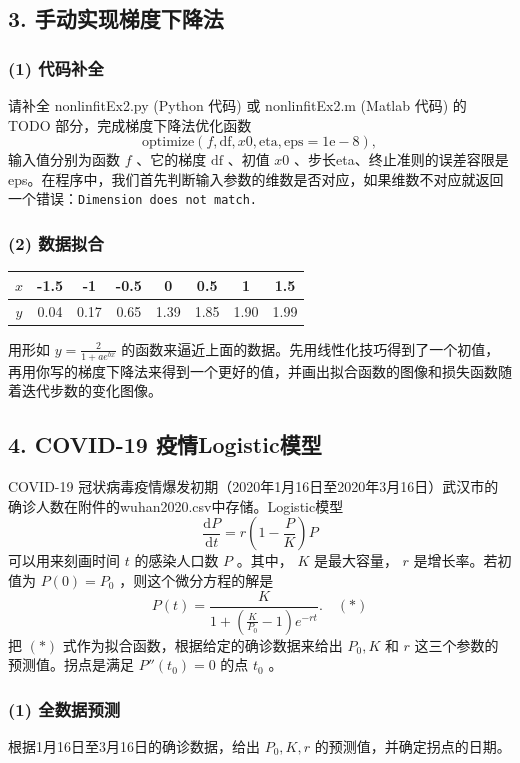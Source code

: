 \documentclass{article}
\begin{document}
\subsection*{3. 手动实现梯度下降法}
\subsubsection*{(1) 代码补全}
请补全 nonlinfitEx2.py (Python 代码) 或 nonlinfitEx2.m (Matlab 代码) 的 TODO 部分，完成梯度下降法优化函数
\[
\mathrm{optimize}(f, \mathrm{df}, x0, \mathrm{eta}, \mathrm{eps} = 1\mathrm{e}{-}8),
\]
输入值分别为函数 \(f\) 、它的梯度 \(\mathrm{df}\) 、初值 \(x0\) 、步长eta、终止准则的误差容限是eps。在程序中，我们首先判断输入参数的维数是否对应，如果维数不对应就返回一个错误：\texttt{Dimension does not match.}

\subsubsection*{(2) 数据拟合}
\begin{center}
\begin{tabular}{|c|c|c|c|c|c|c|c|}
\hline
$x$ & -1.5 & -1 & -0.5 & 0 & 0.5 & 1 & 1.5 \\
\hline
$y$ & 0.04 & 0.17 & 0.65 & 1.39 & 1.85 & 1.90 & 1.99 \\
\hline
\end{tabular}
\end{center}

用形如 \(y = \frac{2}{1 + a e^{b x}}\) 的函数来逼近上面的数据。先用线性化技巧得到了一个初值，再用你写的梯度下降法来得到一个更好的值，并画出拟合函数的图像和损失函数随着迭代步数的变化图像。

\subsection*{4. COVID-19 疫情Logistic模型}
COVID-19 冠状病毒疫情爆发初期（2020年1月16日至2020年3月16日）武汉市的确诊人数在附件的wuhan2020.csv中存储。Logistic模型
\[
\frac{\mathrm{d}P}{\mathrm{d}t} = r\left(1 - \frac{P}{K}\right)P
\]
可以用来刻画时间 \(t\) 的感染人口数 \(P\) 。其中， \(K\) 是最大容量， \(r\) 是增长率。若初值为 \(P(0) = P_0\) ，则这个微分方程的解是
\[
P(t) = \frac{K}{1 + (\frac{K}{P_0} - 1)e^{-rt}}. \quad (*)
\]
把 \((*)\) 式作为拟合函数，根据给定的确诊数据来给出 \(P_0, K\) 和 \(r\) 这三个参数的预测值。拐点是满足 \(P''(t_0) = 0\) 的点 \(t_0\) 。

\subsubsection*{(1) 全数据预测}
根据1月16日至3月16日的确诊数据，给出 \(P_0, K, r\) 的预测值，并确定拐点的日期。
\end{document}
